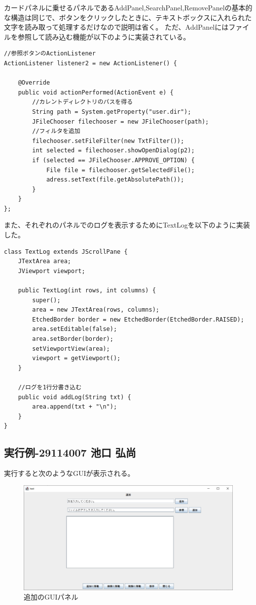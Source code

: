 \documentclass{jarticle}
\begin{document}
カードパネルに乗せるパネルであるAddPanel,SearchPanel,RemovePanelの基本的な構造は同じで、ボタンをクリックしたときに、テキストボックスに入れられた文字を読み取って処理するだけなので説明は省く。
ただ、AddPanelにはファイルを参照して読み込む機能が以下のように実装されている。
\begin{lstlisting}[caption=ファイルの参照,label=src:FileChooser]
//参照ボタンのActionListener
ActionListener listener2 = new ActionListener() {

	@Override
	public void actionPerformed(ActionEvent e) {
    	//カレントディレクトリのパスを得る
		String path = System.getProperty("user.dir");
		JFileChooser filechooser = new JFileChooser(path);
        //フィルタを追加
		filechooser.setFileFilter(new TxtFilter());
		int selected = filechooser.showOpenDialog(p2);
		if (selected == JFileChooser.APPROVE_OPTION) {
			File file = filechooser.getSelectedFile();
			adress.setText(file.getAbsolutePath());
		}
	}
};
\end{lstlisting}

また、それぞれのパネルでのログを表示するためにTextLogを以下のように実装した。
\begin{lstlisting}[caption=TextLog,label=src:TextLog]
class TextLog extends JScrollPane {
	JTextArea area;
	JViewport viewport;

	public TextLog(int rows, int columns) {
		super();
		area = new JTextArea(rows, columns);
		EtchedBorder border = new EtchedBorder(EtchedBorder.RAISED);
		area.setEditable(false);
		area.setBorder(border);
		setViewportView(area);
		viewport = getViewport();
	}

	//ログを1行分書き込む
	public void addLog(String txt) {
		area.append(txt + "\n");
	}
}
\end{lstlisting}



\subsection{実行例-29114007 池口 弘尚}
実行すると次のようなGUIが表示される。


\begin{figure}[!hbt]
  \centering
  \includegraphics[bb=0 0 986 493,width=1.2\linewidth]{pic1.png}
  \caption{追加のGUIパネル}
  \label{fig:pic1}
\end{figure}
\end{document}
